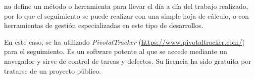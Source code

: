 \scrum{} no define un método o herramienta para llevar el día a día del trabajo realizado, por lo que el seguimiento se puede realizar con una simple hoja de cálculo, o con herramientas de gestión especializadas en este tipo de desarrollos.

En este caso, se ha utilizado \textit{PivotalTracker} (\url{https://www.pivotaltracker.com/}) para el seguimiento. Es un software potente al que se accede mediante un navegador y sirve de control de tareas y defectos. Su licencia ha sido gratuita por tratarse de un proyecto público.

